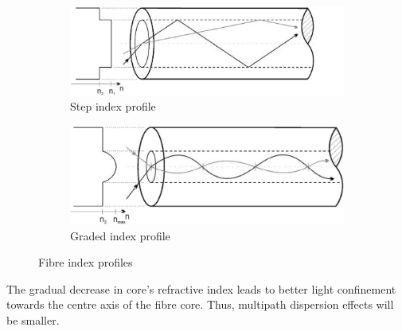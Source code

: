 \documentclass{standalone}
\begin{document}
\begin{figure}[h]
	\centering
	\begin{subfigure}[b]{0.6\textwidth}
		\includegraphics[width=\textwidth]{index_profiles_step.png}
		\caption{Step index profile}
		\vspace*{1em}
	\end{subfigure}
	\begin{subfigure}[b]{0.6\textwidth}
		\includegraphics[width=\textwidth]{index_profiles_graded.png}
		\caption{Graded index profile}
	\end{subfigure}
	\caption{Fibre index profiles  \cite{fer:oks}}
	\label{fig:index_profiles}
\end{figure}
The gradual decrease in core's refractive index leads to better light confinement towards the centre axis of the fibre core. Thus, multipath dispersion effects will be smaller.\\
\end{document}
